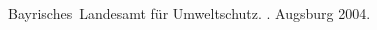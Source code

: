\documentclass[a4paper,11pt,pdftex,twoside]{scrartcl}
\begin{document}
\pagebreak





\appendix


\begin{thebibliography}{1}


Bayrisches~Landesamt f\"ur Umweltschutz.
.
Augsburg 2004.


\end{thebibliography}
\end{document}
